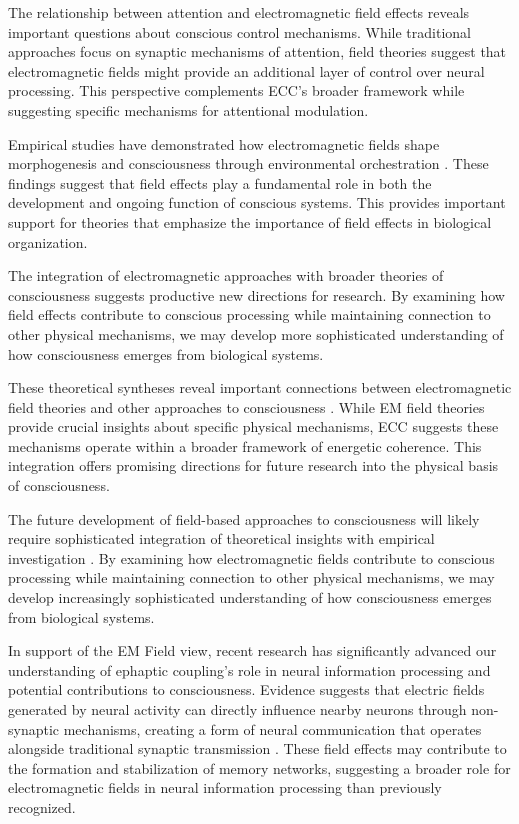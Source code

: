 \begin{refsection}
The relationship between attention and electromagnetic field effects \cite{Prinz2012} reveals important questions about conscious control mechanisms. While traditional approaches focus on synaptic mechanisms of attention, field theories suggest that electromagnetic fields might provide an additional layer of control over neural processing. This perspective complements ECC's broader framework while suggesting specific mechanisms for attentional modulation.

Empirical studies have demonstrated how electromagnetic fields shape morphogenesis and consciousness through environmental orchestration \cite{Rouleau2014}. These findings suggest that field effects play a fundamental role in both the development and ongoing function of conscious systems. This provides important support for theories that emphasize the importance of field effects in biological organization.

The integration of electromagnetic approaches with broader theories of consciousness \cite{McFadden2020} suggests productive new directions for research. By examining how field effects contribute to conscious processing while maintaining connection to other physical mechanisms, we may develop more sophisticated understanding of how consciousness emerges from biological systems.

These theoretical syntheses reveal important connections between electromagnetic field theories and other approaches to consciousness \cite{John2001}. While EM field theories provide crucial insights about specific physical mechanisms, ECC suggests these mechanisms operate within a broader framework of energetic coherence. This integration offers promising directions for future research into the physical basis of consciousness.

The future development of field-based approaches to consciousness will likely require sophisticated integration of theoretical insights with empirical investigation \cite{Singer2001}. By examining how electromagnetic fields contribute to conscious processing while maintaining connection to other physical mechanisms, we may develop increasingly sophisticated understanding of how consciousness emerges from biological systems.

In support of the EM Field view, recent research has significantly advanced our understanding of ephaptic coupling's role in neural information processing and potential contributions to consciousness. Evidence suggests that electric fields generated by neural activity can directly influence nearby neurons through non-synaptic mechanisms, creating a form of neural communication that operates alongside traditional synaptic transmission \cite{Pinotsis2023Ephaptic}. These field effects may contribute to the formation and stabilization of memory networks, suggesting a broader role for electromagnetic fields in neural information processing than previously recognized.


\end{refsection}

